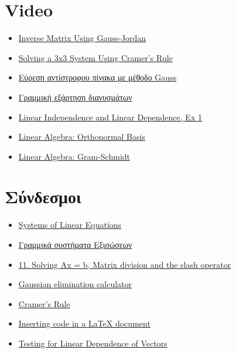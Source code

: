 \documentclass[12pt, fleqn, leqno]{extreport}
\begin{document}
\section{Video}
\begin{itemize}
    \item \href{https://www.youtube.com/watch?v=cJg2AuSFdjw}{Inverse Matrix Using Gauss-Jordan}
    \item \href{https://youtu.be/X5rDjbp0t6s}{Solving a 3x3 System Using Cramer's Rule}
    \item \href{https://youtu.be/0vB1sgebS9c}{Εύρεση αντίστροφου πίνακα με μέθοδο Gauss}
    \item \href{https://youtu.be/Gmt1fmlrEto}{Γραμμική εξάρτηση διανυσμάτων}
    \item \href{https://youtu.be/yLi8RxqfowA}{Linear Independence and Linear Dependence, Ex 1}
    \item \href{https://www.youtube.com/watch?v=ZJu26chXEiw}{Linear Algebra: Orthonormal Basis}
    \item \href{https://www.youtube.com/watch?v=Aslf3KGq2UE}{Linear Algebra: Gram-Schmidt}
\end{itemize}
\section{Σύνδεσμοι}
\begin{itemize}
    \item \href{http://sites.science.oregonstate.edu/math/home/programs/undergrad/CalculusQuestStudyGuides/vcalc/system/system.html}{Systems of Linear Equations}
    \item \href{http://esperia.iesl.forth.gr/~kafesaki/Applied-Mathematics/linear-algebra/linear-systems.pdf}{Γραμμικά συστήματα Εξισώσεων}
    \item \href{http://www-h.eng.cam.ac.uk/help/programs/octave/tutorial/}{11. Solving Ax = b, Matrix division and the slash operator}
    \item \href{https://onlinemschool.com/math/assistance/equation/gaus/}{Gaussian elimination calculator}
    \item \href{http://www.matrixlab-examples.com/cramers-rule.html}{Cramer's Rule}
    \item \href{https://pt.overleaf.com/learn/latex/Code_listing}{Inserting code in a LaTeX document}
    \item \href{http://sites.science.oregonstate.edu/math/home/programs/undergrad/CalculusQuestStudyGuides/vcalc/lindep/lindep.html}{Testing for Linear Dependence of Vectors}
\end{itemize}
\end{document}
